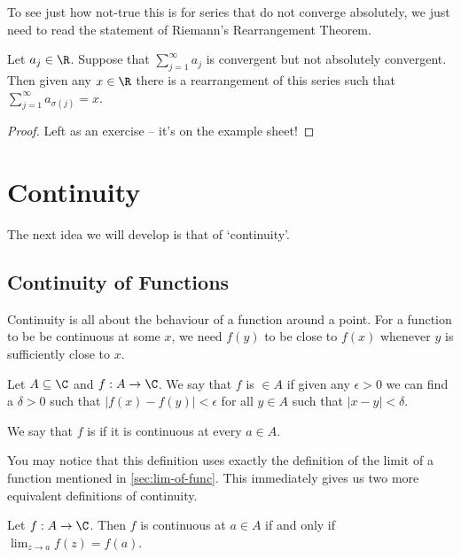 \documentclass[a4paper]{scrartcl}
\begin{document}
To see just how not-true this is for series that do not converge absolutely, we just need to read the statement of Riemann's Rearrangement Theorem.

\begin{theorem}
	Let $a_j \in \R$. Suppose that $\sum_{j = 1}^{\infty} a_j$ is convergent but not absolutely convergent. Then given any $x \in \R$ there is a rearrangement of this series such that $\sum_{j = 1}^{\infty} a_{\sigma(j)} = x$.
\end{theorem}
\begin{proof}
	Left as an exercise -- it's on the example sheet!
\end{proof}

\clearpage
\section{Continuity}

The next idea we will develop is that of `continuity'. 

\subsection{Continuity of Functions}

Continuity is all about the behaviour of a function around a point. For a function to be be continuous at some $x$, we need $f(y)$ to be close to $f(x)$ whenever $y$ is sufficiently close to $x$.

\begin{definition}[Continuity]
	Let $A \subseteq \C$ and $f: A \rightarrow \C$. We say that $f$ is  $\in A$ if given any $\epsilon > 0$ we can find a $\delta > 0$ such that $|f(x) - f(y)| < \epsilon$ for all $y \in A$ such that $|x - y| < \delta$.


	We say that $f$ is  if it is continuous at every $a \in A$.
\end{definition}

You may notice that this definition uses exactly the definition of the limit of a function mentioned in \autoref{sec:lim-of-func}. This immediately gives us two more equivalent definitions of continuity.

\begin{proposition}
	Let $f: A \rightarrow \C$. Then $f$ is continuous at $a \in A$ if and only if $\displaystyle \lim_{z \to a} f(z) = f(a)$.
\end{proposition}
\end{document}
